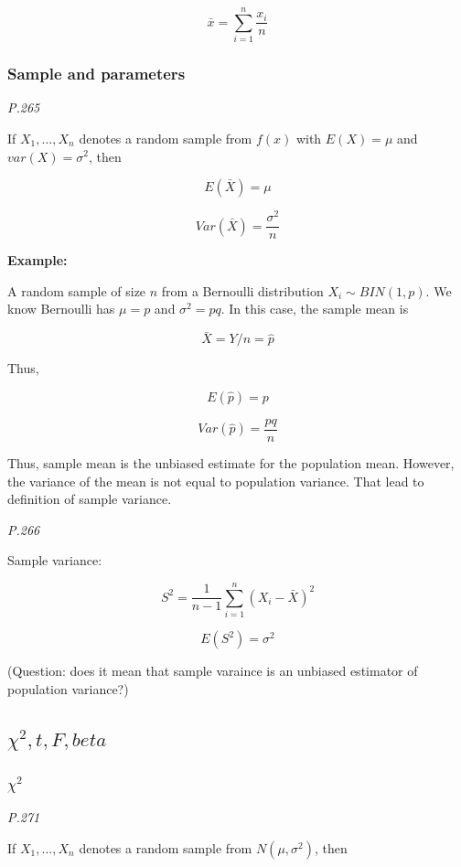 \documentclass[]{book}
\begin{document}
\[\bar{x}=\sum_{i=1}^n \frac{x_i}{n}\]

\hypertarget{sample-and-parameters}{%
\subsubsection{Sample and parameters}\label{sample-and-parameters}}

\emph{P.265}

If \(X_1,..., X_n\) denotes a random sample from \(f(x)\) with \(E(X)=\mu\) and \(var(X)=\sigma^2\), then

\[E(\bar{X})=\mu\]

\[Var(\bar{X})=\frac{\sigma^2}{n}\]

\textbf{Example:}

A random sample of size \(n\) from a Bernoulli distribution \(X_i \sim BIN(1,p)\). We know Bernoulli has \(\mu=p\) and \(\sigma^2 =pq\). In this case, the sample mean is

\[\bar{X}=Y/n=\hat{p}\]

Thus,

\[E(\hat{p})=p\]

\[Var (\hat{p})=\frac{pq}{n}\]

Thus, sample mean is the unbiased estimate for the population mean. However, the variance of the mean is not equal to population variance. That lead to definition of sample variance.

\emph{P.266}

Sample variance:

\[S^2=\frac{1}{n-1}\sum_{i=1}^n(X_i-\bar{X})^2\]

\[E(S^2)=\sigma^2\]

(Question: does it mean that sample varaince is an unbiased estimator of population variance?)

\hypertarget{chi2-t-f-beta}{%
\subsection{\texorpdfstring{\(\chi^2, t, F, beta\)}{\textbackslash chi\^{}2, t, F, beta}}\label{chi2-t-f-beta}}

\hypertarget{chi2}{%
\subsubsection{\texorpdfstring{\(\chi^2\)}{\textbackslash chi\^{}2}}\label{chi2}}

\emph{P.271}

If \(X_1,...,X_n\) denotes a random sample from \(N(\mu,\sigma^2)\), then
\end{document}
